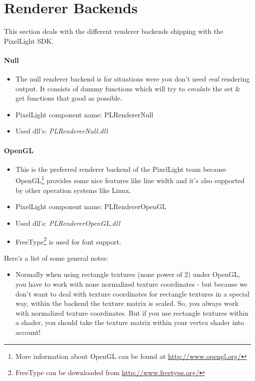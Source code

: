 \section{Renderer Backends}
This section deals with the different renderer backends shipping with the PixelLight SDK.


\paragraph{Null}
\begin{itemize}
\item The null renderer backend is for situations were you don't need \emph{real} rendering output. It consists of dummy functions which will try to \emph{emulate} the set \& get functions that good as possible.
\item PixelLight component name: PLRendererNull
\item Used dll's: \emph{PLRendererNull.dll}
\end{itemize}


\paragraph{OpenGL}
\begin{itemize}
\item This is the preferred renderer backend of the PixelLight team because OpenGL\footnote{More information about OpenGL can be found at \url{http://www.opengl.org/}} provides some nice features like line width and it's also supported by other operation systems like Linux.
\item PixelLight component name: PLRendererOpenGL
\item Used dll's: \emph{PLRendererOpenGL.dll}
\item FreeType\footnote{FreeType can be downloaded from \url{http://www.freetype.org/}} is used for font support.
\end{itemize}

Here's a list of some general notes:
\begin{itemize}
\item Normally when using rectangle textures (none power of 2) under OpenGL, you have to work with none normalized texture coordinates - but because we don't want to deal with texture coordinates for rectangle textures in a special way, within the backend the texture matrix is scaled. So, you always work with normalized texture coordinates. But if you use rectangle textures within a shader, you should take the texture matrix within your vertex shader into account!
\end{itemize}

